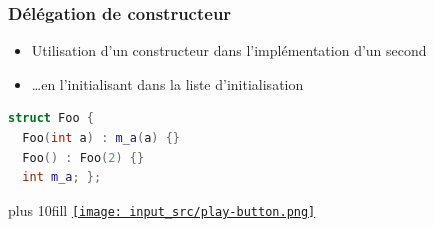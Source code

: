 \documentclass[C++.tex]{subfiles}
\begin{document}
\begin{frame}[fragile]
	\frametitle{Délégation de constructeur}
	\begin{itemize}
		\item Utilisation d'un constructeur dans l'implémentation d'un second
		\item \ldots{}en \og l'initialisant\fg{} dans la liste d'initialisation
	\end{itemize}

	\begin{lstlisting}[language=C++]
struct Foo {
  Foo(int a) : m_a(a) {}
  Foo() : Foo(2) {}
  int m_a; };\end{lstlisting}

	\vskip 10mm plus 10fill
	\hfill
	\href{https://godbolt.org/#g:!((g:!((g:!((h:codeEditor,i:(filename:'1',fontScale:14,fontUsePx:'0',j:1,lang:c%2B%2B,selection:(endColumn:1,endLineNumber:33,positionColumn:1,positionLineNumber:33,selectionStartColumn:1,selectionStartLineNumber:33,startColumn:1,startLineNumber:33),source:'%23include+%3Ciostream%3E%0A%0Aclass+Foo%0A%7B%0Apublic:%0A++Foo(int+a)%0A++++:+m_a(a)%0A++%7B%0A++%7D%0A%0A++Foo()%0A++++:+Foo(2)%0A++%7B%0A++%7D%0A%0A++void+print()%0A++%7B%0A++++std::cout+%3C%3C+m_a+%3C%3C+!'%5Cn!'%3B%0A++%7D%0A%0Aprivate:%0A++int+m_a%3B%0A%7D%3B%0A%0Aint+main()%0A%7B%0A++Foo+foo(4)%3B%0A++Foo+bar%3B%0A%0A++foo.print()%3B%0A++bar.print()%3B%0A%7D%0A'),l:'5',n:'0',o:'C%2B%2B+source+%231',t:'0')),k:50,l:'4',n:'0',o:'',s:0,t:'0'),(g:!((h:executor,i:(argsPanelShown:'1',compilationPanelShown:'0',compiler:g112,compilerOutShown:'0',execArgs:'',execStdin:'',fontScale:14,fontUsePx:'0',j:1,lang:c%2B%2B,libs:!((name:boost,ver:'175')),options:'-std%3Dc%2B%2B11',source:1,stdinPanelShown:'1',tree:'1',wrap:'0'),l:'5',n:'0',o:'Executor+x86-64+gcc+11.2+(C%2B%2B,+Editor+%231)',t:'0')),header:(),k:50,l:'4',n:'0',o:'',s:0,t:'0')),l:'2',n:'0',o:'',t:'0')),version:4}{\texttt{[image: input\_src/play-button.png]}}
\end{frame}
\end{document}
